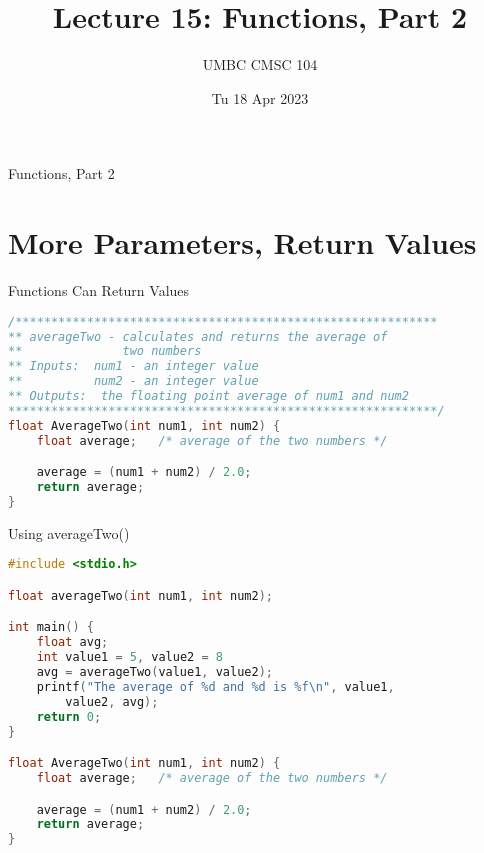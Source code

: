 \documentclass[graphics]{beamer}
\title{Lecture 15: Functions, Part 2}
\author{UMBC CMSC 104}
\date{Tu 18 Apr 2023}
\begin{document}
\begin{frame}{}
\centering
    Functions, Part 2
\end{frame}

\frame{\tableofcontents}

\section{More Parameters, Return Values}
\begin{frame}[fragile]{Functions Can Return Values}
    \begin{lstlisting}[language=C,basicstyle=\footnotesize,keywordstyle=\color{blue},commentstyle=\color{green},showstringspaces=false,stringstyle=\color{red}]
/***********************************************************
** averageTwo - calculates and returns the average of
**              two numbers
** Inputs:  num1 - an integer value
**          num2 - an integer value
** Outputs:  the floating point average of num1 and num2
************************************************************/
float AverageTwo(int num1, int num2) {
	float average;   /* average of the two numbers */

	average = (num1 + num2) / 2.0;
	return average;
}
    \end{lstlisting}
\end{frame}

\begin{frame}[fragile]{Using averageTwo()}
    \begin{lstlisting}[language=C,basicstyle=\footnotesize,keywordstyle=\color{blue},commentstyle=\color{green},showstringspaces=false,stringstyle=\color{red}]
#include <stdio.h>

float averageTwo(int num1, int num2);

int main() {
    float avg;
    int value1 = 5, value2 = 8
    avg = averageTwo(value1, value2);
    printf("The average of %d and %d is %f\n", value1,
        value2, avg);
    return 0;
}

float AverageTwo(int num1, int num2) {
	float average;   /* average of the two numbers */

	average = (num1 + num2) / 2.0;
	return average;
}
    \end{lstlisting}
\end{frame}
\end{document}
